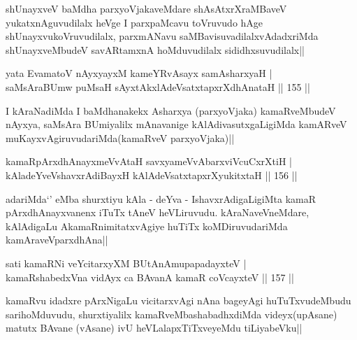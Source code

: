 \begin{artha}
shUnayxveV baMdha parxyoVjakaveMdare shAsAtxrXraMBaveV yukatxnAguvudilalx heVge I parxpaMcavu toVruvudo hAge shUnayxvukoVruvudilalx, parxmANavu saMBavisuvadilalxvAdadxriMda shUnayxveMbudeV savARtamxnA hoMduvudilalx sididhxsuvudilalx||
\end{artha}


\begin{shl}
yata EvamatoV nAyxyayxM kameYRvAsayx samAsharxyaH |\\
saMsAraBUmw puMsaH sAyxtAkxlAdeVsatxtapxrXdhAnataH \hfill || 155 ||
\end{shl}

\begin{artha}
I kAraNadiMda I baMdhanakekx Asharxya (parxyoVjaka) kamaRveMbudeV nAyxya, saMsAra BUmiyalilx mAnavanige kAlAdivasutxgaLigiMda kamARveV muKayxvAgiruvudariMda(kamaRveV parxyoVjaka)||
\end{artha}

\begin{shl}
kamaRpArxdhAnayxmeVvAtaH savxyameVvAbarxviVcuCxrXtiH |\\
kAladeYveVshavxrAdiBayxH kAlAdeVsatxtapxrXyukitxtaH \hfill || 156 ||
\end{shl}

\begin{artha}
adariMda`\stext' eMba shurxtiyu  kAla - deYva - IshavxrAdigaLigiMta kamaR pArxdhAnayxvanenx iTuTx tAneV heVLiruvudu. kAraNaveVneMdare, kAlAdigaLu AkamaRnimitatxvAgiye huTiTx koMDiruvudariMda kamAraveVparxdhAna||
\end{artha}


\begin{shl}
sati kamaRNi veYcitarxyXM BUtAnAmupapadayxteV |\\
kamaRshabedxVna vidAyx ca BAvanA kamaR coVcayxteV \hfill || 157 ||
\end{shl}

\begin{artha}
kamaRvu idadxre pArxNigaLu vicitarxvAgi nAna bageyAgi huTuTxvudeMbudu sarihoMduvudu, shurxtiyalilx kamaRveMbashabadhxdiMda videyx(upAsane) matutx BAvane (vAsane) ivU heVLalapxTiTxveyeMdu tiLiyabeVku||
\end{artha}


